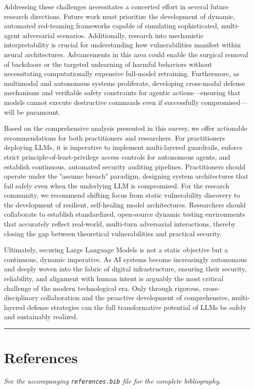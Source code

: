 \documentclass[11pt,a4paper]{article}
\begin{document}
Addressing these challenges necessitates a concerted effort in several future research directions. Future work must prioritize the development of dynamic, automated red-teaming frameworks capable of simulating sophisticated, multi-agent adversarial scenarios. Additionally, research into mechanistic interpretability is crucial for understanding how vulnerabilities manifest within neural architectures. Advancements in this area could enable the surgical removal of backdoors or the targeted unlearning of harmful behaviors without necessitating computationally expensive full-model retraining. Furthermore, as multimodal and autonomous systems proliferate, developing cross-modal defense mechanisms and verifiable safety constraints for agentic actions---ensuring that models cannot execute destructive commands even if successfully compromised---will be paramount.

Based on the comprehensive analysis presented in this survey, we offer actionable recommendations for both practitioners and researchers. For practitioners deploying LLMs, it is imperative to implement multi-layered guardrails, enforce strict principle-of-least-privilege access controls for autonomous agents, and establish continuous, automated security auditing pipelines. Practitioners should operate under the "assume breach" paradigm, designing system architectures that fail safely even when the underlying LLM is compromised. For the research community, we recommend shifting focus from static vulnerability discovery to the development of resilient, self-healing model architectures. Researchers should collaborate to establish standardized, open-source dynamic testing environments that accurately reflect real-world, multi-turn adversarial interactions, thereby closing the gap between theoretical vulnerabilities and practical security.

Ultimately, securing Large Language Models is not a static objective but a continuous, dynamic imperative. As AI systems become increasingly autonomous and deeply woven into the fabric of digital infrastructure, ensuring their security, reliability, and alignment with human intent is arguably the most critical challenge of the modern technological era. Only through rigorous, cross-disciplinary collaboration and the proactive development of comprehensive, multi-layered defense strategies can the full transformative potential of LLMs be safely and sustainably realized.

\noindent\rule{\textwidth}{0.4pt}
\section{References}

\textit{See the accompanying \texttt{references.bib} file for the complete bibliography.}




\end{document}
